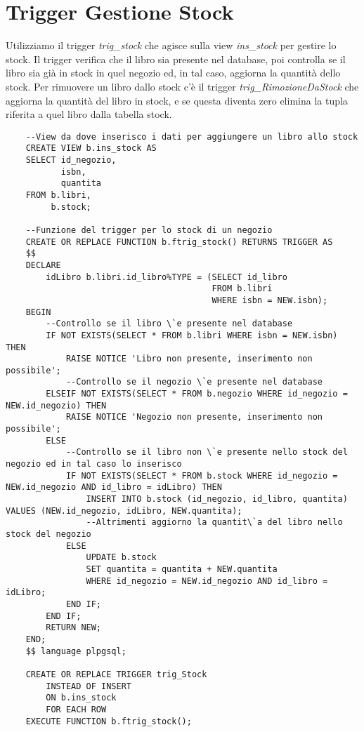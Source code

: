 \section{Trigger Gestione Stock}
Utilizziamo il trigger \textit{trig\_stock} che agisce sulla view \textit{ins\_stock} per gestire lo stock. 
Il trigger verifica che il libro sia presente nel database, poi controlla se il libro sia gi\`a in stock in 
quel negozio ed, in tal caso, aggiorna la quantit\`a dello stock. Per rimuovere un libro dallo stock c'\`e 
il trigger \textit{trig\_RimozioneDaStock} che aggiorna la quantit\`a del libro in stock, e se questa diventa 
zero elimina la tupla riferita a quel libro dalla tabella stock.
\begin{lstlisting}
    --View da dove inserisco i dati per aggiungere un libro allo stock
    CREATE VIEW b.ins_stock AS
    SELECT id_negozio,
           isbn,
           quantita
    FROM b.libri,
         b.stock;
    
    --Funzione del trigger per lo stock di un negozio
    CREATE OR REPLACE FUNCTION b.ftrig_stock() RETURNS TRIGGER AS
    $$
    DECLARE
        idLibro b.libri.id_libro%TYPE = (SELECT id_libro
                                         FROM b.libri
                                         WHERE isbn = NEW.isbn);
    BEGIN
        --Controllo se il libro \`e presente nel database
        IF NOT EXISTS(SELECT * FROM b.libri WHERE isbn = NEW.isbn) THEN
            RAISE NOTICE 'Libro non presente, inserimento non possibile';
            --Controllo se il negozio \`e presente nel database
        ELSEIF NOT EXISTS(SELECT * FROM b.negozio WHERE id_negozio = NEW.id_negozio) THEN
            RAISE NOTICE 'Negozio non presente, inserimento non possibile';
        ELSE
            --Controllo se il libro non \`e presente nello stock del negozio ed in tal caso lo inserisco
            IF NOT EXISTS(SELECT * FROM b.stock WHERE id_negozio = NEW.id_negozio AND id_libro = idLibro) THEN
                INSERT INTO b.stock (id_negozio, id_libro, quantita) VALUES (NEW.id_negozio, idLibro, NEW.quantita);
                --Altrimenti aggiorno la quantit\`a del libro nello stock del negozio
            ELSE
                UPDATE b.stock
                SET quantita = quantita + NEW.quantita
                WHERE id_negozio = NEW.id_negozio AND id_libro = idLibro;
            END IF;
        END IF;
        RETURN NEW;
    END;
    $$ language plpgsql;
    
    CREATE OR REPLACE TRIGGER trig_Stock
        INSTEAD OF INSERT
        ON b.ins_stock
        FOR EACH ROW
    EXECUTE FUNCTION b.ftrig_stock();
    

\end{lstlisting}
